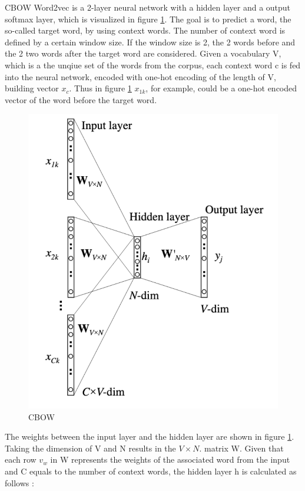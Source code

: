 \documentclass[12pt, a4paper, titlepage]{article}
\begin{document}
\ac{CBOW} Word2vec is a 2-layer neural network with a hidden layer and a output softmax layer, which is visualized in figure \ref{fig: F1}. The goal is to predict a word, the so-called target word, by using context words. The number of context word is defined by a certain window size. If the window size is 2, the 2 words before and the 2 two words after the target word are considered. Given a vocabulary V, which is a the unqiue set of the words from the corpus, each context word c is fed into the neural network, encoded with one-hot encoding of the length of V, building vector $x_c$. Thus in figure \ref*{fig: F1} $x_{1k}$, for example, could be a one-hot encoded vector of the word before the target word. 

\begin{figure}[hb!]
  \center
  \includegraphics[scale=0.5]{word2vecCBOW.png}
  \caption{\label{fig: F1} \ac{CBOW} \citep[6]{rong2014}}
\end{figure}

The weights between the input layer and the hidden layer are shown in figure \ref{fig: F1}. Taking the dimension of V and N results in the $V \times N$. matrix W. Given that each row $v_w$ in W represents the weights of the associated word from the input and C equals to the number of context words, the hidden layer h is calculated as follows \citep{rong2014}:
\end{document}
